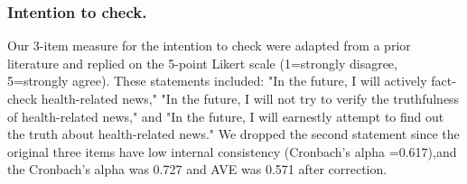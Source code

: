 \subsubsection{Intention to check.}
Our 3-item measure for the intention to check were adapted from a prior literature and replied on the 5-point Likert scale (1=strongly disagree, 5=strongly agree).
These statements included: "In the future, I will actively fact-check health-related news," "In the future, I will not try to verify the truthfulness of health-related news," and "In the future, I will earnestly attempt to find out the truth about health-related news."
We dropped the second statement since the original three items have low internal consistency (Cronbach’s alpha =0.617),and the Cronbach’s alpha was 0.727 and AVE was 0.571 after correction.





